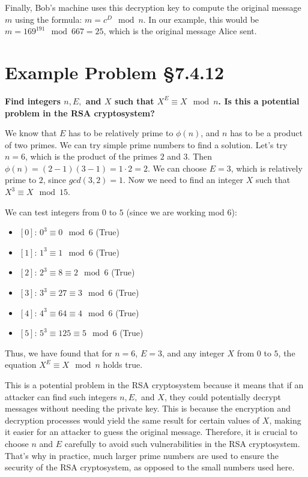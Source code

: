 \documentclass{article}
\begin{document}
Finally, Bob's machine uses this decryption key to compute the original message $m$ using the formula: $m = c^D \mod n$. In our example, this would be $m = 169^{191} \mod 667 = 25$, which is the original message Alice sent.

\section{Example Problem \S 7.4.12}
\textbf{Find integers $n, E,$ and $X$ such that $X^E\equiv X \mod n$. Is this a potential problem in the RSA cryptosystem?}

We know that $E$ has to be relatively prime to $\phi(n)$, and $n$ has to be a product of two primes. We can try simple prime numbers to find a solution. Let's try $n = 6$, which is the product of the primes $2$ and $3$. Then $\phi(n) = (2-1)(3-1) = 1 \cdot 2 = 2$. We can choose $E = 3$, which is relatively prime to $2$, since $gcd(3, 2) = 1$. Now we need to find an integer $X$ such that $X^3 \equiv X \mod 15$.

We can test integers from $0$ to $5$ (since we are working mod $6$):
\begin{itemize}
  \item $[0]$: $0^3 \equiv 0 \mod 6$ (True)
  \item $[1]$: $1^3 \equiv 1 \mod 6$ (True)
  \item $[2]$: $2^3 \equiv 8 \equiv 2 \mod 6$ (True)
  \item $[3]$: $3^3 \equiv 27 \equiv 3 \mod 6$ (True)
  \item $[4]$: $4^3 \equiv 64 \equiv 4 \mod 6$ (True)
  \item $[5]$: $5^3 \equiv 125 \equiv 5 \mod 6$ (True)
\end{itemize}

Thus, we have found that for $n = 6$, $E = 3$, and any integer $X$ from $0$ to $5$, the equation $X^E \equiv X \mod n$ holds true.

This is a potential problem in the RSA cryptosystem because it means that if an attacker can find such integers $n, E,$ and $X$, they could potentially decrypt messages without needing the private key. This is because the encryption and decryption processes would yield the same result for certain values of $X$, making it easier for an attacker to guess the original message. Therefore, it is crucial to choose $n$ and $E$ carefully to avoid such vulnerabilities in the RSA cryptosystem. That's why in practice, much larger prime numbers are used to ensure the security of the RSA cryptosystem, as opposed to the small numbers used here.
\end{document}
